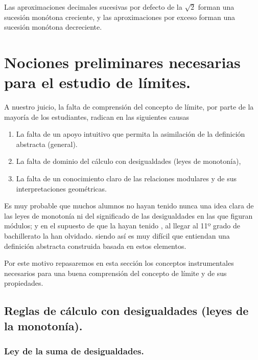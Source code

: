 \documentclass[oneside,english,spanish,2m,twoside,svgnames,x11names,HTML,twoside,12pt]{libro-matua}\usepackage[]{graphicx}\usepackage[]{color}
\begin{document}
\begin{ejemplo}

Las aproximaciones decimales sucesivas por defecto de la $\sqrt{2}$
forman una sucesión monótona creciente, y las aproximaciones por exceso
forman una sucesión monótona decreciente.

\end{ejemplo}

\section{Nociones preliminares necesarias para el estudio de límites.}

\intro

A nuestro juicio, la falta de comprensión del concepto de límite,
por parte de la mayoría de los estudiantes, radican en las siguientes
causas 
\begin{enumerate}
\item La falta de un apoyo intuitivo que permita la asimilación de la definición
abstracta (general).
\item La falta de dominio del cálculo con desigualdades (leyes de monotonía), 
\item La falta de un conocimiento claro de las relaciones modulares y de
sus interpretaciones geométricas.
\end{enumerate}
Es muy probable que muchos alumnos no hayan tenido nunca una idea
clara de las leyes de monotonía ni del significado de las desigualdades
en las que figuran módulos; y en el supuesto de que la hayan tenido
, al llegar al 11º grado de bachillerato la han olvidado. siendo así
es muy difícil que entiendan una definición abstracta construida basada
en estos elementos.

Por este motivo repasaremos en esta sección los conceptos instrumentales
necesarios para una buena comprensión del concepto de límite y de
sus propiedades.

\subsection{Reglas de cálculo con desigualdades (leyes de la monotonía).}

\subsubsection{Ley de la suma de desigualdades.}

\end{document}
